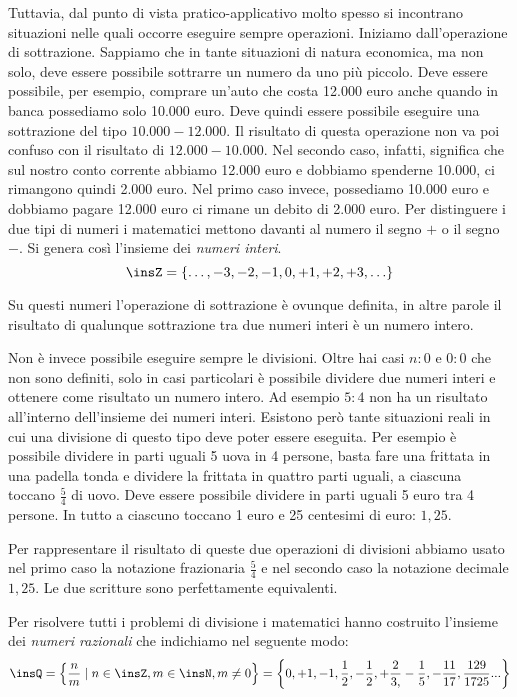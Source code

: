 Tuttavia, dal punto di vista pratico-applicativo molto spesso si incontrano 
situazioni nelle quali occorre eseguire sempre operazioni. Iniziamo 
dall'operazione di sottrazione. Sappiamo che in tante situazioni di natura 
economica, ma non solo, deve essere possibile sottrarre un numero da uno più 
piccolo. Deve essere possibile, per esempio, comprare un'auto che costa 12.000 
euro anche quando in banca possediamo solo 10.000 euro. Deve quindi essere 
possibile eseguire una sottrazione del tipo $10.000-12.000$. Il risultato di 
questa operazione non va poi confuso con il risultato di $12.000-10.000$. Nel 
secondo caso, infatti, significa che sul nostro conto corrente abbiamo 12.000 
euro e dobbiamo spenderne 10.000, ci rimangono quindi 2.000 euro. Nel primo 
caso 
invece, possediamo 10.000 euro e dobbiamo pagare
12.000 euro ci rimane un debito di 2.000 euro. Per distinguere i due tipi di 
numeri i matematici mettono davanti al numero il segno $+$ o il segno $-$. Si 
genera così l'insieme dei \emph{numeri interi}.
\[\insZ=\{\ldots,-3,-2,-1,0,+1,+2,+3,\ldots\}\]

Su questi numeri l'operazione di sottrazione è ovunque definita, in altre 
parole 
il risultato di qualunque sottrazione tra due numeri interi è un numero intero.

Non è invece possibile eseguire sempre le divisioni. Oltre hai casi $n:0$ e 
$0:0$ che non sono definiti, solo in casi particolari è possibile dividere 
due numeri interi e ottenere come risultato un numero intero. Ad esempio $5:4$ 
non ha un risultato all'interno dell'insieme dei numeri interi. 
Esistono però tante situazioni reali in cui una divisione di questo tipo deve 
poter essere eseguita. Per esempio è possibile dividere in parti uguali 5 uova 
in 4 persone, basta fare una frittata in una padella tonda e dividere la 
frittata in quattro parti uguali, a ciascuna toccano $\frac{5}{4}$ di uovo. Deve
essere possibile dividere in parti uguali 5 euro tra 4 persone. 
In tutto a ciascuno toccano 1 euro e 25 centesimi di euro: $1,25$.

Per rappresentare il risultato di queste due operazioni di divisioni abbiamo 
usato nel primo caso la notazione frazionaria $\frac{5}{4}$ e nel secondo caso 
la notazione decimale $1,25$. Le due scritture sono perfettamente equivalenti.

Per risolvere tutti i problemi di divisione i matematici hanno costruito 
l'insieme dei \emph{numeri razionali} che indichiamo nel seguente modo:
\[
\insQ=\left\{\frac{n}{m} \mid n\in \insZ,m\in \insN,m\neq
0\right\}=\left\{0,+1,-1,\frac{1}{2},-\frac{1}{2},+\frac{2}{3,}-\frac{1}{5},
-\frac{11}{17},\frac{129}{1725}...\right\}
\]

